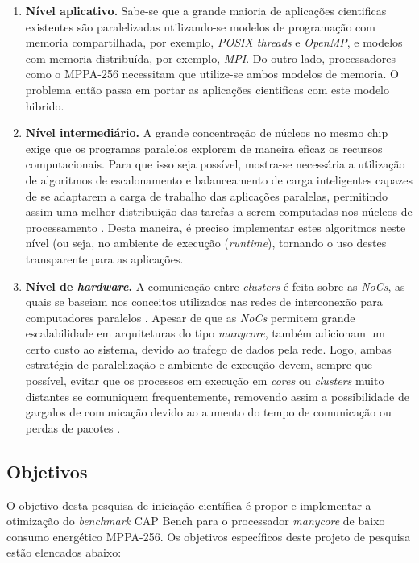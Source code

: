 \documentclass[a4paper,11pt]{article}
\newcommand{\mppa}{MPPA-256\xspace}
\newcommand{\capb}{CAP Bench\xspace}
\newcommand{\manycore}{\textit{manycore}\xspace}
\newcommand{\bench}{\textit{benchmark}\xspace}
\begin{document}
\begin{enumerate}

	\item \textbf{Nível aplicativo.} Sabe-se que a grande maioria de aplicações cientificas existentes são paralelizadas utilizando-se modelos de programação com memoria compartilhada, por exemplo, \textit{POSIX threads} e \textit{OpenMP}, e modelos com memoria distribuída, por exemplo, \textit{MPI}. Do outro lado, processadores como o \mppa necessitam que utilize-se ambos modelos de memoria. O problema então passa em portar as aplicações cientificas com este modelo hibrido.
		
	\item \textbf{Nível intermediário.} A grande concentração de núcleos no mesmo chip exige que os programas paralelos explorem de maneira eficaz os recursos computacionais. Para que isso seja possível, mostra-se necessária a utilização de algoritmos de escalonamento e balanceamento de carga inteligentes capazes de se adaptarem a carga de trabalho das aplicações paralelas, permitindo assim uma melhor distribuição das tarefas a serem computadas
nos núcleos de processamento \cite{penna:hal-01239916}. Desta maneira, é preciso implementar estes algoritmos neste nível (ou seja, no ambiente de execução (\textit{runtime}), tornando o uso destes transparente para as aplicações.

	\item \textbf{Nível de \emph{hardware}.} A comunicação entre \textit{clusters} é feita sobre as \textit{NoCs}, as quais se baseiam nos conceitos utilizados nas redes de interconexão para computadores paralelos \cite{4586199}. Apesar de que as \textit{NoCs} permitem grande escalabilidade em arquiteturas do tipo \manycore, também adicionam um certo custo ao sistema, devido ao trafego de dados pela rede. Logo, ambas estratégia de paralelização e ambiente de execução devem, sempre que possível, evitar que os processos em execução em \textit{cores} ou \textit{clusters} muito distantes se comuniquem frequentemente, removendo assim a possibilidade de gargalos de comunicação devido ao aumento do tempo de comunicação ou perdas de pacotes \cite{5452474, 6112995}.
	
\end{enumerate}

\subsection{Objetivos}

O objetivo desta pesquisa de iniciação científica é propor e implementar a otimização do \bench \capb para o processador \manycore de baixo consumo energético \mppa. Os objetivos específicos deste projeto de pesquisa estão elencados abaixo:
\end{document}
